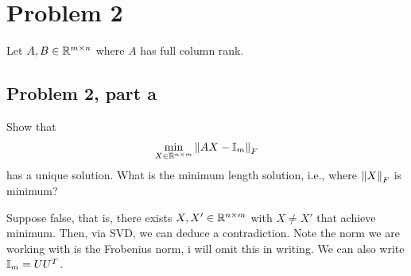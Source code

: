 \newpage
\section{Problem 2}
Let $A, B \in \mathbb{R}^{m \times n}$ where $A$ has full column rank.

\subsection{Problem 2, part a}
Show that 
\[
\min_{X \in \mathbb{R}^{n\times m}} \norm{AX - \mathbb{I}_m}_F
\]
has a unique solution. What is the minimum length solution, i.e., where $\norm{X}_F$ is minimum?
\partbreak
\begin{solution}

    Suppose false, that is, there exists $X, X' \in \mathbb{R}^{n \times m}$ with $X \neq X'$ that achieve minimum. Then, via SVD, we can deduce a contradiction. Note the norm we are working with is the Frobenius norm, i will omit this in writing. We can also write $\mathbb{I}_m = UU^T$.


\end{solution}
